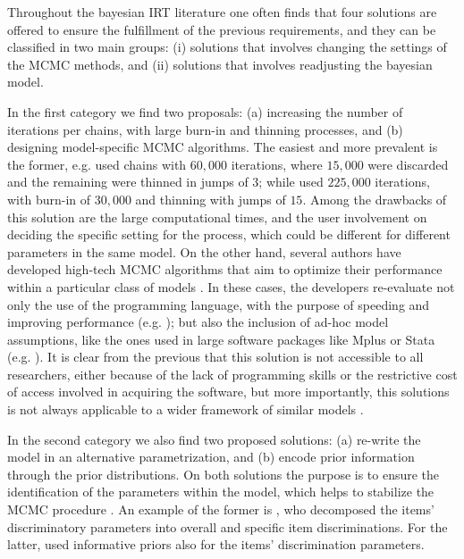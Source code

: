 Throughout the bayesian IRT literature one often finds that four solutions are offered to ensure the fulfillment of the previous requirements, and they can be classified in two main groups: (i) solutions that involves changing the settings of the MCMC methods, and (ii) solutions that involves readjusting the bayesian model. 

In the first category we find two proposals: (a) increasing the number of iterations per chains, with large burn-in and thinning processes, and (b) designing model-specific MCMC algorithms. The easiest and more prevalent is the former, e.g. \citet{Fujimoto_2018a} used chains with $60,000$ iterations, where $15,000$ were discarded and the remaining were thinned in jumps of $3$; while \citet{Fujimoto_2018b} used $225,000$ iterations, with burn-in of $30,000$ and thinning with jumps of $15$. Among the drawbacks of this solution are the large computational times, and the user involvement on deciding the specific setting for the process, which could be different for different parameters in the same model. On the other hand, several authors have developed high-tech MCMC algorithms that aim to optimize their performance within a particular class of models \cite{Papaspiliopoulos_et_al_2007}. In these cases, the developers re-evaluate not only the use of the programming language, with the purpose of speeding and improving performance (e.g. \citet{Fujimoto_2018a}); but also the inclusion of ad-hoc model assumptions, like the ones used in large software packages like Mplus \cite{Muthen_et_al_2011} or Stata (e.g. \citet{Rabe_et_al_2004c}). It is clear from the previous that this solution is not accessible to all researchers, either because of the lack of programming skills or the restrictive cost of access involved in acquiring the software, but more importantly, this solutions is not always applicable to a wider framework of similar models \cite{Papaspiliopoulos_et_al_2007}.

In the second category we also find two proposed solutions: (a) re-write the model in an alternative parametrization, and (b) encode prior information through the prior distributions. On both solutions the purpose is to ensure the identification of the parameters within the model, which helps to stabilize the MCMC procedure \cite{Gelman_et_al_2014}. An example of the former is \citet{Fujimoto_2018a}, who decomposed the items' discriminatory parameters into overall and specific item discriminations. For the latter, \citet{Fujimoto_2020} used informative priors also for the items' discrimination parameters.


